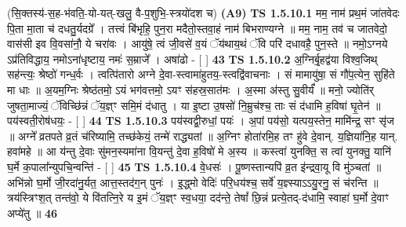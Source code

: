 \documentclass[17pt]{extarticle}
\begin{document}
                  \newline
                      (सि॒क्तस्य॑-स॒ह-भ॑वति॒-यो-यत्-खलु॒ वै-प॒शुभि॒-स्त्रयो॑दश च)  \textbf{(A9)} \newline \newline
                                        \textbf{ TS 1.5.10.1} \newline
                  मम॒ नाम॑ प्रथ॒मं जा॑तवेदः पि॒ता मा॒ता च॑ दधतु॒र्यदग्रे᳚ । तत्त्वं बि॑भृहि॒ पुन॒रा मदैतो॒स्तवा॒हं नाम॑ बिभराण्यग्ने ॥ मम॒ नाम॒ तव॑ च जातवेदो॒ वास॑सी इव वि॒वसा॑नौ॒ ये चरा॑वः । आयु॑षे॒ त्वं जी॒वसे॑ व॒यं ॅय॑थाय॒थं ॅवि परि॑ दधावहै॒ पुन॒स्ते ॥ नमो॒ऽग्नये ऽप्र॑तिविद्धाय॒ नमोऽना॑धृष्टाय॒ नमः॑ स॒म्राजे᳚ । अषा॑ढो - [ ] \textbf{  43} \newline
                  \newline
                                \textbf{ TS 1.5.10.2} \newline
                  अ॒ग्निर्बृ॒हद्व॑या विश्व॒जिथ् सह॑न्त्यः॒ श्रेष्ठो॑ गन्ध॒र्वः । त्वत्पि॑तारो अग्ने दे॒वा-स्त्वामा॑हुतय॒-स्त्वद्वि॑वाचनाः । सं मामायु॑षा॒ सं गौ॑प॒त्येन॒ सुहि॑ते मा धाः ॥ अ॒यम॒ग्निः श्रेष्ठ॑तमो॒ ऽयं भग॑वत्तमो॒ ऽयꣳ स॑हस्र॒सात॑मः । अ॒स्मा अ॑स्तु सु॒वीर्यं᳚ ॥ मनो॒ ज्योति॑र् जुषता॒माज्यं॒ ॅविच्छि॑न्नं ॅय॒ज्ञ्ꣳ समि॒मं द॑धातु । या इ॒ष्टा उ॒षसो॑ नि॒म्रुच॑श्च॒ ताः सं द॑धामि ह॒विषा॑ घृ॒तेन॑ ॥ पय॑स्वती॒रोष॑धयः॒ - [ ] \textbf{  44} \newline
                  \newline
                                \textbf{ TS 1.5.10.3} \newline
                  पय॑स्वद्वी॒रुधां॒ पयः॑ । अ॒पां पय॑सो॒ यत्पय॒स्तेन॒ मामि॑न्द्र॒ सꣳ सृ॑ज ॥ अग्ने᳚ व्रतपते व्र॒तं च॑रिष्यामि॒ तच्छ॑केयं॒ तन्मे॑ राद्ध्यतां ॥ अ॒ग्निꣳ होता॑रमि॒ह तꣳ हु॑वे दे॒वान्. य॒ज्ञिया॑नि॒ह यान्. हवा॑महे ॥ आ य॑न्तु दे॒वाः सु॑मन॒स्यमा॑ना वि॒यन्तु॑ दे॒वा ह॒विषो॑ मे अ॒स्य ॥ कस्त्वा॑ युनक्ति॒ स त्वा॑ युनक्तु॒ यानि॑ घ॒र्मे क॒पाला᳚न्युपचि॒न्वन्ति॑ - [ ] \textbf{  45} \newline
                  \newline
                                \textbf{ TS 1.5.10.4} \newline
                  वे॒धसः॑ । पू॒ष्णस्तान्यपि॑ व्र॒त इ॑न्द्रवा॒यू वि मु॑ञ्चतां ॥अभि॑न्नो घ॒र्मो जी॒रदा॑नु॒र्यत॒ आत्त॒स्तद॑ग॒न् पुनः॑ । इ॒द्ध्मो वेदिः॑ परि॒धय॑श्च॒ सर्वे॑ य॒ज्ञ्स्याऽऽयु॒रनु॒ सं च॑रन्ति ॥ त्रय॑स्त्रिꣳश॒त् तन्त॑वो॒॒ ये वि॑तत्नि॒रे य इ॒मं ॅय॒ज्ञ्ꣳ स्व॒धया॒ दद॑न्ते॒ तेषां᳚ छि॒न्नं प्रत्ये॒तद्-द॑धामि॒ स्वाहा॑ घ॒र्मो दे॒वाꣳ अप्ये॑तु ॥ \textbf{  46} \newline
\end{document}
